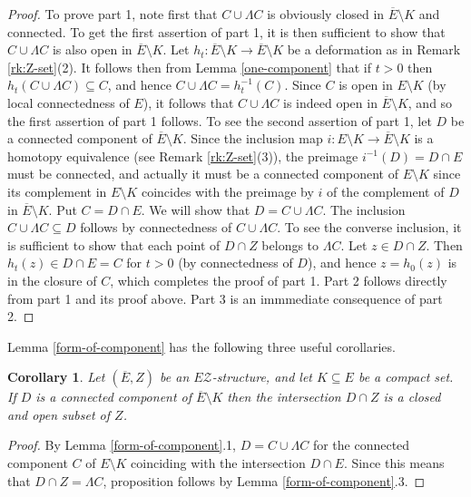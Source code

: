 \documentclass[12pt, a4paper]{article}
\newcommand{\8}{\infty}
\theoremstyle{break}
\newtheorem{cor}[thm]{Corollary}
\theoremstyle{defbreak}
\newcommand{\ol}[1]{\overline{#1}}
\begin{document}
\begin{proof}
To prove part 1, note first that $C\cup\Lambda C$ is obviously closed in $\ol E\setminus K$
and connected. To get the first assertion of part 1, it is then sufficient
to show that $C\cup\Lambda C$ is also open in $\ol E\setminus K$.
Let $h_t:\ol E\setminus K\to\ol E\setminus K$ be a deformation as
in Remark \ref{rk:Z-set}(2). It follows then from Lemma \ref{one-component} 
that if $t>0$ then 
$h_t(C\cup\Lambda C)\subseteq C$, and hence 
$C\cup\Lambda C=h_t^{-1}(C)$.
Since $C$ is open in $E\setminus K$ (by local connectedness of $E$),
it follows that $C\cup\Lambda C$ is indeed open in $\ol E\setminus K$,
and so the first assertion of part 1 follows. To see the second assertion
of part 1, let $D$ be a connected component of $\ol E\setminus K$.
Since the inclusion map $i:E\setminus K\to\ol E\setminus K$
is a homotopy equivalence (see Remark \ref{rk:Z-set}(3)),
the preimage $i^{-1}(D)=D\cap E$ must be connected,
and actually it must be a connected component of $E\setminus K$
since its complement in  $E\setminus K$ coincides with the
preimage by $i$ of the complement of $D$ in $\ol E\setminus K$.
Put $C=D\cap E$. We will show that $D=C\cup\Lambda C$.
The inclusion $C\cup\Lambda C\subseteq D$ follows by connectedness
of $C\cup\Lambda C$. To see the converse inclusion,
it is sufficient to show that each point of $D\cap Z$ belongs to 
$\Lambda C$. Let $z\in D\cap Z$. Then $h_t(z)\in D\cap E=C$ for
$t>0$ (by connectedness of $D$), and hence $z=h_0(z)$ is
in the closure of $C$, which completes the proof of part 1.
Part 2 follows directly from part 1 and its proof above.
Part 3 is an immmediate consequence of part 2.
\end{proof}


Lemma \ref{form-of-component} has the following three useful 
corollaries.\medskip


\begin{cor}\label{limit-clopen}
Let $(\ol E,Z)$ be an $E\mathcal{Z}$-structure, and let $K\subseteq E$
be a compact set. If $D$ is a connected component of $\ol E\setminus K$
then the intersection $D\cap Z$ is a closed and open subset of $Z$.
\end{cor}

\begin{proof}
By Lemma \ref{form-of-component}.1, 
$D=C\cup\Lambda C$ for the connected component $C$
of $E\setminus K$ coinciding with the intersection $D\cap E$. Since this
means that $D\cap Z=\Lambda C$, proposition follows by Lemma 
\ref{form-of-component}.3. 
\end{proof}
\end{document}
